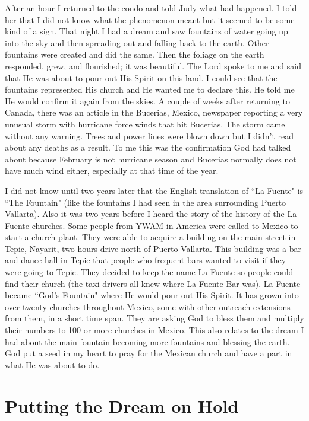 \documentclass[oneside]{book}
\begin{document}
After an hour I returned to the condo and told Judy what had happened. I told her that I did not know what the phenomenon meant but it seemed to be some kind of a sign. That night I had a dream and saw fountains of water going up into the sky and then spreading out and falling back to the earth. Other fountains were created and did the same. Then the foliage on the earth responded, grew, and flourished; it was beautiful. The Lord spoke to me and said that He was about to pour out His Spirit on this land. I could see that the fountains represented His church and He wanted me to declare this. He told me He would confirm it again from the skies. A couple of weeks after returning to Canada, there was an article in the Bucerias, Mexico, newspaper reporting a very unusual storm with hurricane force winds that hit Bucerias. The storm came without any warning. Trees and power lines were blown down but I didn't read about any deaths as a result. To me this was the confirmation God had talked about because February is not hurricane season and Bucerias normally does not have much wind either, especially at that time of the year.

I did not know until two years later that the English translation of ``La Fuente" is ``The Fountain" (like the fountains I had seen in the area surrounding Puerto Vallarta). Also it was two years before I heard the story of the history of the La Fuente churches. Some people from YWAM in America were called to Mexico to start a church plant. They were able to acquire a building on the main street in Tepic, Nayarit, two hours drive north of Puerto Vallarta. This building was a bar and dance hall in Tepic that people who frequent bars wanted to visit if they were going to Tepic. They decided to keep the name La Fuente so people could find their church (the taxi drivers all knew where La Fuente Bar was). La Fuente became ``God's Fountain" where He would pour out His Spirit. It has grown into over twenty churches throughout Mexico, some with other outreach extensions from them, in a short time span. They are asking God to bless them and multiply their numbers to 100 or more churches in Mexico. This also relates to the dream I had about the main fountain becoming more fountains and blessing the earth. God put a seed in my heart to pray for the Mexican church and have a part in what He was about to do.


\section{Putting the Dream on Hold}
\
\end{document}
